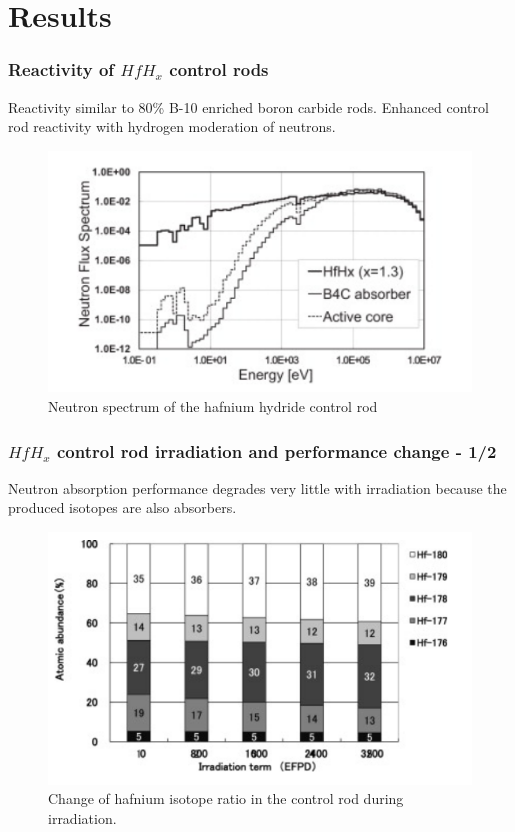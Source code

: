 \documentclass[9pt]{beamer}
\newcommand{\hfh}{$HfH_{x}$\xspace}
\begin{document}
\section{Results}



\begin{frame}
\frametitle{Reactivity of \hfh control rods}
Reactivity similar to 80\% B-10 enriched boron carbide rods.
Enhanced control rod reactivity with hydrogen moderation of neutrons.
\begin{figure}[htbp!]
  \begin{center}
      \includegraphics[scale=0.5]{./images/spectrum.png}
  \end{center}
  \caption{Neutron spectrum of the hafnium hydride control rod}
  \label{fig:spec}
\end{figure}
\end{frame}

\begin{frame}
\frametitle{\hfh control rod irradiation and performance change - 1/2}
Neutron absorption performance degrades very little with irradiation
because the produced isotopes are also absorbers.
\begin{figure}[htbp!]
  \begin{center}
      \includegraphics[scale=0.5]{./images/irrad_isotope.png}
  \end{center}
  \caption{Change of hafnium isotope ratio in the control rod during irradiation.}
  \label{fig:irrad_iso}
\end{figure}
\end{frame}
\end{document}
